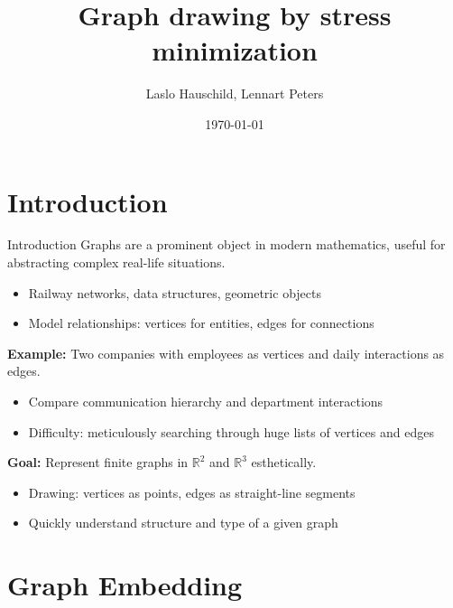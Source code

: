 \documentclass{beamer}
\title{Graph drawing by stress minimization}
\author{Laslo Hauschild, Lennart Peters}
\date{\today}
\begin{document}
\begin{frame}
    \titlepage
\end{frame}

\section{Introduction}

\begin{frame}{Introduction}
    Graphs are a prominent object in modern mathematics, useful for abstracting complex real-life situations.
    \begin{itemize}
        \item Railway networks, data structures, geometric objects
        \item Model relationships: vertices for entities, edges for connections
    \end{itemize}
\end{frame}

\begin{frame}
    \textbf{Example:} Two companies with employees as vertices and daily interactions as edges.
    \begin{itemize}
        \item Compare communication hierarchy and department interactions
        \item Difficulty: meticulously searching through huge lists of vertices and edges
    \end{itemize}
    \textbf{Goal:} Represent finite graphs in $\mathbb{R}^2$ and $\mathbb{R}^3$ esthetically.
    \begin{itemize}
        \item Drawing: vertices as points, edges as straight-line segments
        \item Quickly understand structure and type of a given graph
    \end{itemize}
\end{frame}

\section{Graph Embedding}
\end{document}
